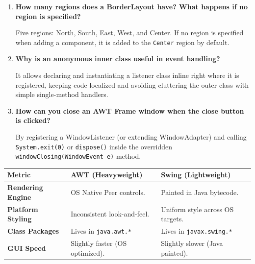 \documentclass[12pt,a4paper]{article}
\newcommand{\Q}[1]{\textbf{#1}\par\noindent\ignorespaces}
\renewcommand{\arraystretch}{1.45}
\begin{document}
\begin{tcolorbox}[exambox, title={\textbf{Frequently Asked / Viva Questions}}]
\begin{enumerate}[leftmargin=*, label=\textbf{Q\arabic*.}, itemsep=5pt]
  \item \Q{How many regions does a BorderLayout have? What happens if no region is specified?}
        Five regions: North, South, East, West, and Center. If no region is specified when adding a component, it is added to the \texttt{Center} region by default.
        
  \item \Q{Why is an anonymous inner class useful in event handling?}
        It allows declaring and instantiating a listener class inline right where it is registered, keeping code localized and avoiding cluttering the outer class with simple single-method handlers.
        
  \item \Q{How can you close an AWT Frame window when the close button is clicked?}
        By registering a WindowListener (or extending WindowAdapter) and calling \texttt{System.exit(0)} or \texttt{dispose()} inside the overridden \texttt{windowClosing(WindowEvent e)} method.
\end{enumerate}
\end{tcolorbox}

\begin{tcolorbox}[tikzbox, title={Comparison: AWT vs. Swing}]
\centering
{\renewcommand{\arraystretch}{1.45}%
\begin{tabularx}{\linewidth}{|B{3.2cm}|Y|Y|}
\hline
\textbf{Metric} & \textbf{AWT (Heavyweight)} & \textbf{Swing (Lightweight)} \\
\hline
\textbf{Rendering Engine} & OS Native Peer controls. & Painted in Java bytecode. \\
\hline
\textbf{Platform Styling} & Inconsistent look-and-feel. & Uniform style across OS targets. \\
\hline
\textbf{Class Packages} & Lives in \texttt{java.awt.*} & Lives in \texttt{javax.swing.*} \\
\hline
\textbf{GUI Speed} & Slightly faster (OS optimized). & Slightly slower (Java painted). \\
\hline
\end{tabularx}}
\end{tcolorbox}
\end{document}
